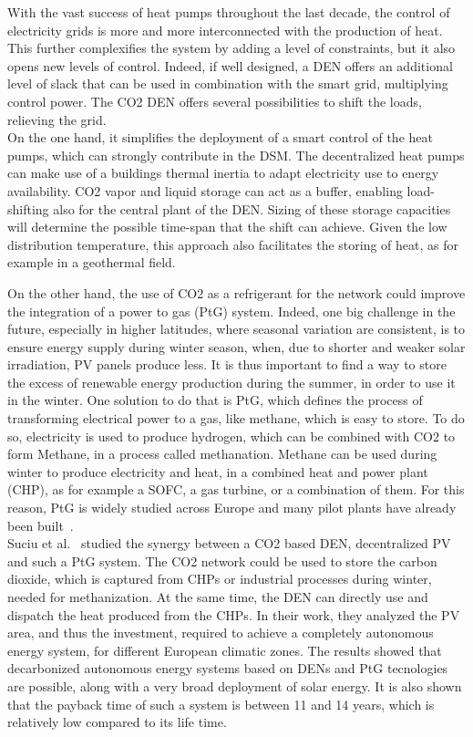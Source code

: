 \documentclass{article}
\begin{document}
With the vast success of heat pumps throughout the last decade, the control of electricity grids is more and more interconnected with the production of heat. This further complexifies the system by adding a level of constraints, but it also opens new levels of control. Indeed, if well designed, a DEN offers an additional level of slack that can be used in combination with the smart grid, multiplying control power. The CO2 DEN offers several possibilities to shift the loads, relieving the grid. \\

On the one hand, it simplifies the deployment of a smart control of the heat pumps, which can strongly contribute in the DSM. The decentralized heat pumps can make use of a buildings thermal inertia to adapt electricity use to energy availability. CO2 vapor and liquid storage can act as a buffer, enabling load-shifting also for the central plant of the DEN. Sizing of these storage capacities will determine the possible time-span that the shift can achieve. Given the low distribution temperature, this approach also facilitates the storing of heat, as for example in a geothermal field.

On the other hand, the use of CO2 as a refrigerant for the network could improve the integration of a power to gas (PtG) system. Indeed, one big challenge in the future, especially in higher latitudes, where seasonal variation are consistent, is to ensure energy supply during winter season, when, due to shorter and weaker solar irradiation, PV panels produce less. It is thus important to find a way to store the excess of renewable energy production during the summer, in order to use it in the winter.
One solution to do that is PtG, which defines the process of transforming electrical power to a gas, like methane, which is easy to store. To do so, electricity is used to produce hydrogen, which can be combined with CO2 to form Methane, in a process called methanation. Methane can be used during winter to produce electricity and heat, in a combined heat and power plant (CHP), as for example a SOFC, a gas turbine, or a combination of them. For this reason, PtG is widely studied across Europe and many pilot plants have already been built~\cite{ProjectsEuropeEuropean}.\\ 
Suciu et al.~\cite{suciuEnergyIntegrationCO22018} studied the synergy between a CO2 based DEN, decentralized PV and such a PtG system. The CO2 network could be used to store the carbon dioxide, which is captured from CHPs or industrial processes during winter, needed for methanization. At the same time, the DEN can directly use and dispatch the heat produced from the CHPs. In their work, they analyzed the PV area, and thus the investment, required to achieve a completely autonomous energy system, for different European climatic zones. The results showed that decarbonized autonomous energy systems based on DENs and PtG tecnologies are possible, along with a very broad deployment of solar energy. It is also shown that the payback time of such a system is between 11 and 14 years, which is relatively low compared to its life time.
\end{document}
